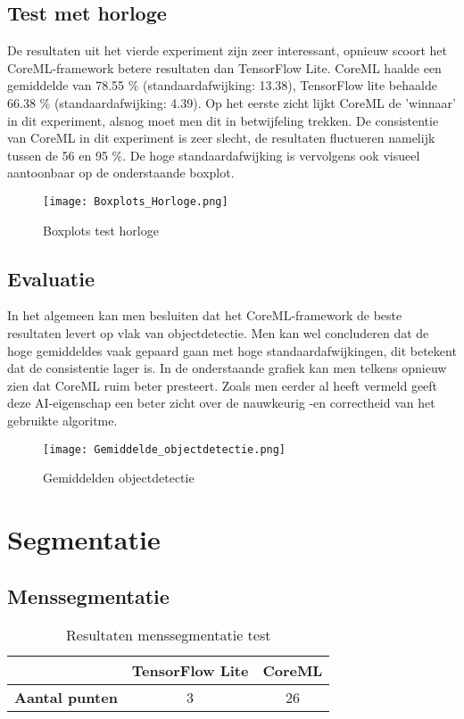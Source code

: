 \subsection{Test met horloge}
De resultaten uit het vierde experiment zijn zeer interessant, opnieuw scoort het CoreML-framework betere resultaten dan TensorFlow Lite. CoreML haalde een gemiddelde van 78.55 \% (standaardafwijking: 13.38), TensorFlow lite behaalde 66.38 \% (standaardafwijking: 4.39). Op het eerste zicht lijkt CoreML de 'winnaar' in dit experiment, alsnog moet men dit in betwijfeling trekken. De consistentie van CoreML in dit experiment is zeer slecht, de resultaten fluctueren namelijk tussen de  56 en 95 \%. De hoge standaardafwijking is vervolgens ook visueel aantoonbaar op de onderstaande boxplot.
\begin{figure}[H]
	\centering
	\texttt{[image: Boxplots\_Horloge.png]}
	\caption{Boxplots test horloge}
\end{figure}
\subsection{Evaluatie}
In het algemeen kan men besluiten dat het CoreML-framework de beste  resultaten levert op vlak van objectdetectie. Men kan wel concluderen dat de hoge gemiddeldes vaak gepaard gaan met hoge standaardafwijkingen, dit betekent dat de consistentie lager is. In de onderstaande grafiek kan men telkens opnieuw zien dat CoreML ruim beter presteert. Zoals men eerder al heeft vermeld geeft deze AI-eigenschap een beter zicht over de nauwkeurig -en correctheid van het gebruikte algoritme.
\begin{figure}[H]
	\centering
	\texttt{[image: Gemiddelde\_objectdetectie.png]}
	\caption{Gemiddelden objectdetectie}
\end{figure}

\section{Segmentatie}
\subsection{Menssegmentatie}
\begin{table}[H]
	\centering
	\begin{tabular}{|c|c|c|}
		\hline
		& \textbf{TensorFlow Lite} & \textbf{CoreML} \\ \hline
		\textbf{Aantal punten} & 3                        & 26              \\ \hline
	\end{tabular}
	\caption{Resultaten menssegmentatie test}
\end{table}

